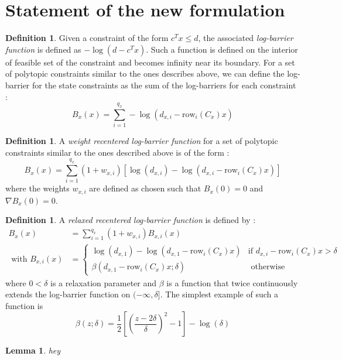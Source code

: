 \documentclass[12pt]{article}
\newtheorem{lemma}[theorem]{Lemma}
\theoremstyle{definition}
\newtheorem{definition}[theorem]{Definition}
\theoremstyle{remark}
\begin{document}
\section{Statement of the new formulation}
\begin{definition}
	Given a constraint of the form $c^Tx\leq d$, the associated \textit{log-barrier function} is defined as $-\log(d-c^Tx)$.
	Such a function is defined on the interior of feasible set of the constraint and becomes infinity near its boundary.
	For a set of polytopic constraints similar to the ones describes above, we can define the log-barrier for the state constraints as the sum of the log-barriers for each constraint :
	$$B_x(x)=\sum_{i=1}^{q_x}-\log(d_{x,i}-\mathrm{row}_i(C_x)x)$$

\end{definition}
\begin{definition}
	A \textit{weight recentered log-barrier function} for a set of polytopic constraints similar to the ones described above is of the form :
	$$B_x(x)=\sum_{i=1}^{q_x}(1+w_{x,i})\left[\log(d_{x,i})-\log(d_{x,i}-\mathrm{row}_i(C_x)x)\right]$$
	where the weights $w_{x,i}$ are defined as chosen such that $B_x(0)=0$ and $\nabla B_x(0)=0$.
\end{definition}
\begin{definition}
	A \textit{relaxed recentered log-barrier function} is defined by :
	\begin{align*}
		B_x(x)&=\sum_{i=1}^{q_x}(1+w_{x,i})B_{x,i}(x)\\
		\text{ with }B_{x,i}(x)&=\begin{cases}
			\log(d_{x,1})-\log(d_{x,1}-\mathrm{row}_i(C_x)x)&\text{if }d_{x,i}-\mathrm{row}_i(C_x)x>\delta\\
			\beta(d_{x,1}-\mathrm{row}_i(C_x)x;\delta)&\text{ otherwise}
		\end{cases}
	\end{align*}
	where $0<\delta$ is a relaxation parameter and $\beta$ is a function that twice continuously extends the log-barrier function on $(-\infty,\delta]$.
	The simplest example of such a function is 
	$$\beta(z;\delta)=\frac{1}{2}\left[ \left( \frac{z-2\delta}{\delta} \right)^2-1 \right]-\log(\delta)$$
\end{definition}
\begin{lemma}
	\label{RRLB-quadratic-bound}
	hey
\end{lemma}
\end{document}

